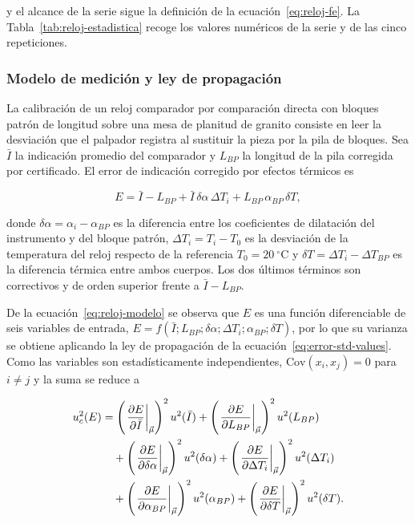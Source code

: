 y el alcance de la serie sigue la definición de la
ecuación~\eqref{eq:reloj-fe}. La Tabla~\ref{tab:reloj-estadistica} recoge los valores
numéricos de la serie y de las cinco repeticiones.



\subsubsection{Modelo de medición y ley de propagación}

La calibración de un reloj comparador por comparación directa con bloques patrón de
longitud sobre una mesa de planitud de granito \parencite{inacal_pc014, cem_di010}
consiste en leer la desviación que el palpador registra al sustituir la pieza por la
pila de bloques. Sea $\bar{I}$ la indicación promedio del comparador y $L_{BP}$ la
longitud de la pila corregida por certificado. El error de indicación corregido por
efectos térmicos es

\begin{equation}
  E = \bar{I} - L_{BP} + \bar{I}\,\delta\alpha\,\Delta T_i
      + L_{BP}\,\alpha_{BP}\,\delta T,
  \label{eq:reloj-modelo}
\end{equation}

donde $\delta\alpha = \alpha_i - \alpha_{BP}$ es la diferencia entre los coeficientes
de dilatación del instrumento y del bloque patrón, $\Delta T_i = T_i - T_0$ es la
desviación de la temperatura del reloj respecto de la referencia
$T_0 = 20\ ^\circ\text{C}$ y $\delta T = \Delta T_i - \Delta T_{BP}$ es la diferencia
térmica entre ambos cuerpos. Los dos últimos términos son correctivos y de orden
superior frente a $\bar{I} - L_{BP}$.

De la ecuación~\eqref{eq:reloj-modelo} se observa que $E$ es una función diferenciable
de seis variables de entrada,
$E = f(\bar{I}; L_{BP}; \delta\alpha; \Delta T_i; \alpha_{BP}; \delta T)$, por lo que su
varianza se obtiene aplicando la ley de propagación de la
ecuación~\eqref{eq:error-std-values}. Como las variables son estadísticamente
independientes, $\text{Cov}(x_i, x_j) = 0$ para $i \neq j$ y la suma se reduce a

\begin{align}
  u_c^2(E) &=
  \left( \left.\frac{\partial E}{\partial \bar{I}}\right|_{\vec\mu} \right)^2 u^2(\bar{I}) +
  \left( \left.\frac{\partial E}{\partial L_{BP}}\right|_{\vec\mu} \right)^2 u^2(L_{BP}) \nonumber \\
  &\quad + \left( \left.\frac{\partial E}{\partial \delta\alpha}\right|_{\vec\mu} \right)^2 u^2(\delta\alpha) +
  \left( \left.\frac{\partial E}{\partial \Delta T_i}\right|_{\vec\mu} \right)^2 u^2(\Delta T_i) \label{eq:reloj-gum} \\
  &\quad + \left( \left.\frac{\partial E}{\partial \alpha_{BP}}\right|_{\vec\mu} \right)^2 u^2(\alpha_{BP}) +
  \left( \left.\frac{\partial E}{\partial \delta T}\right|_{\vec\mu} \right)^2 u^2(\delta T). \nonumber
\end{align}

